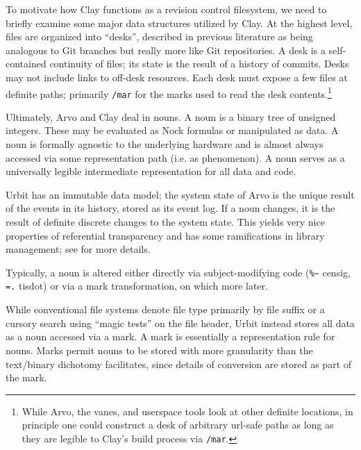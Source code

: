 \documentclass[twoside]{article}
\begin{document}
To motivate how Clay functions as a revision control filesystem, we need to briefly examine some major data structures utilized by Clay.  At the highest level, files are organized into “desks”, described in previous literature as being analogous to Git branches but really more like Git repositories.  A desk is a self-contained continuity of files; its state is the result of a history of commits.  Desks may not include links to off-desk resources.  Each desk must expose a few files at definite paths; primarily \lstinline[style=inlinecode]{/mar} for the marks used to read the desk contents.\footnote{While Arvo, the vanes, and userspace tools look at other definite locations, in principle one could construct a desk of arbitrary {\sc url}-safe paths as long as they are legible to Clay's build process via \lstinline[style=inlinecode]{/mar}.}

Ultimately, Arvo and Clay deal in nouns.  A noun is a binary tree of unsigned integers.  These may be evaluated as Nock formulas or manipulated as data.  A noun is formally agnostic to the underlying hardware and is almost always accessed via some representation path (i.e. as phenomenon).  A noun serves as a universally legible intermediate representation for all data and code.

Urbit has an immutable data model; the system state of Arvo is the unique result of the events in its history, stored as its event log.  If a noun changes, it is the result of definite discrete changes to the system state.  This yields very nice properties of referential transparency and has some ramifications in library management; see \citet{Blackman2024} for more details.

Typically, a noun is altered either directly via subject-modi\-fying code (\lstinline[style=inlinecode]{%~} censig, \lstinline[style=inlinecode]{=.} tisdot) or via a mark transformation, on which more later.

While conventional file systems denote file type primarily by file suffix or a cursory search using “magic tests” on the file header, Urbit instead stores all data as a noun accessed via a mark.  A mark is essentially a representation rule for nouns.  Marks permit nouns to be stored with more granularity than the text/binary dichotomy facilitates, since details of conversion are stored as part of the mark.
\end{document}
